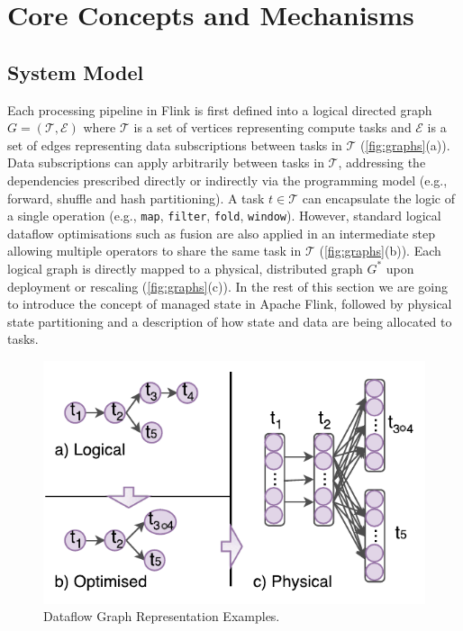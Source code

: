
\section{Core Concepts and Mechanisms}
\label{sec:core}

\subsection{System Model}

Each processing pipeline in Flink is first defined into a logical directed graph $G = (\mathcal{T}, \mathcal{E})$ where $\mathcal{T}$ is a set of vertices representing compute tasks and $\mathcal{E}$ is a set of edges representing data subscriptions between tasks in $\mathcal{T}$ (\autoref{fig:graphs}(a)). Data subscriptions can apply arbitrarily between tasks in $\mathcal{T}$, addressing the dependencies prescribed directly or indirectly via the programming model (e.g., forward, shuffle and hash partitioning). A task $t \in \mathcal{T}$ can encapsulate the logic of a single operation (e.g., \texttt{map}, \texttt{filter}, \texttt{fold}, \texttt{window}). However, standard logical dataflow optimisations  such as fusion \cite{hirzel2014catalog,chambers2010flumejava} are also applied in an intermediate step allowing multiple operators to share the same task in $\mathcal{T}$ (\autoref{fig:graphs}(b)). Each logical graph is directly mapped to a physical, distributed graph $G^*$ upon deployment or rescaling (\autoref{fig:graphs}(c)). In the rest of this section we are going to introduce the concept of managed state in Apache Flink, followed by physical state partitioning and a description of how state and data are being allocated to tasks.

\begin{figure}[t]
\centering
\includegraphics[width=\textwidth / 2]{figures/graphs.pdf}
\vspace*{-5mm}
\caption{Dataflow Graph Representation Examples.} 
\label{fig:graphs}
\vspace{-4mm}
\end{figure}

